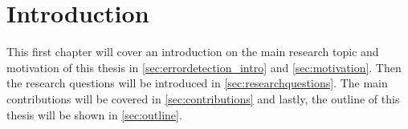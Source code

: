 \chapter{Introduction}
\label{chap:introduction}
This first chapter will cover an introduction on the main research topic and motivation of this thesis in \autoref{sec:errordetection_intro} and \autoref{sec:motivation}. Then the research questions will be introduced in \autoref{sec:researchquestions}. The main contributions will be covered in \autoref{sec:contributions} and lastly, the outline of this thesis will be shown in \autoref{sec:outline}.



